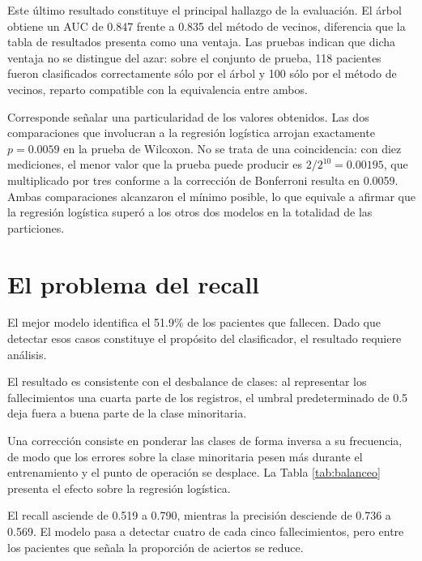\documentclass[11pt]{article}
\begin{document}
Este último resultado constituye el principal hallazgo de la evaluación. El árbol obtiene un AUC
de 0.847 frente a 0.835 del método de vecinos, diferencia que la tabla de resultados presenta como
una ventaja. Las pruebas indican que dicha ventaja no se distingue del azar: sobre el conjunto de
prueba, 118 pacientes fueron clasificados correctamente sólo por el árbol y 100 sólo por el método
de vecinos, reparto compatible con la equivalencia entre ambos.

Corresponde señalar una particularidad de los valores obtenidos. Las dos comparaciones que
involucran a la regresión logística arrojan exactamente $p = 0.0059$ en la prueba de Wilcoxon. No
se trata de una coincidencia: con diez mediciones, el menor valor que la prueba puede producir es
$2/2^{10} = 0.00195$, que multiplicado por tres conforme a la corrección de Bonferroni resulta en
0.0059. Ambas comparaciones alcanzaron el mínimo posible, lo que equivale a afirmar que la
regresión logística superó a los otros dos modelos en la totalidad de las particiones.

\section{El problema del recall}
\label{sec:recall}

El mejor modelo identifica el 51.9\% de los pacientes que fallecen. Dado que detectar esos casos
constituye el propósito del clasificador, el resultado requiere análisis.

El resultado es consistente con el desbalance de clases: al representar los fallecimientos una
cuarta parte de los registros, el umbral predeterminado de 0.5 deja fuera a buena parte de la
clase minoritaria.

Una corrección consiste en ponderar las clases de forma inversa a su frecuencia, de modo que los
errores sobre la clase minoritaria pesen más durante el entrenamiento y el punto de operación se
desplace. La Tabla \ref{tab:balanceo}
presenta el efecto sobre la regresión logística.



El recall asciende de 0.519 a 0.790, mientras la precisión desciende de 0.736 a 0.569. El modelo
pasa a detectar cuatro de cada cinco fallecimientos, pero entre los pacientes que señala la
proporción de aciertos se reduce.
\end{document}
